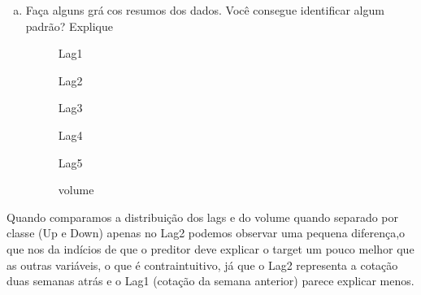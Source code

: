 \documentclass{article}
\begin{document}
    \begin{enumerate}[a.]
    \item Faça alguns grácos resumos dos dados. Você consegue identificar algum padrão? Explique
    
    \newpage
    \begin{figure}[h]
    
    \center
    \qquad
    \caption{Lag1}
    \end{figure}
    
    \begin{figure}[h]
    \center
    \qquad
    \caption{Lag2}
    \end{figure}
    
    \newpage
     \begin{figure}[h]
    \center
    \qquad
    \caption{Lag3}
    \end{figure}
    
     \begin{figure}[h]
    \center
    \qquad
    \caption{Lag4}
    \end{figure}
    
    \newpage
     \begin{figure}[h]
    \center
    \qquad
    \caption{Lag5}
    \end{figure}
    
     \begin{figure}[h]
    \center
    \qquad
    \caption{volume}
    \end{figure}
     \end{enumerate}
     

Quando comparamos a distribuição dos lags e do volume quando separado por classe (Up e Down) apenas no Lag2 podemos observar uma pequena diferença,o que nos da indícios de que o preditor deve explicar o target um pouco melhor que as outras variáveis, o que é contraintuitivo, já que o Lag2 representa a cotação duas semanas atrás e o Lag1 (cotação da semana anterior) parece explicar menos.\\
    
\end{document}
